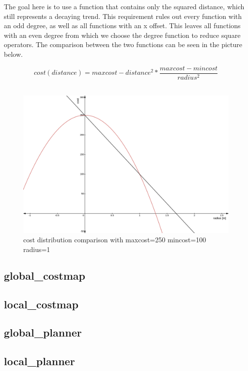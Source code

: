 The goal here is to use a function that contains only the squared distance, which still represents a decaying trend. This requirement rules out every function with an odd degree, as well as all functions with an x offset. This leaves all functions with an even degree from which we choose the  degree function to reduce square operators. The comparison between the two functions can be seen in the picture below.

\[cost(distance)=maxcost-distance^2*\frac{maxcost-mincost}{radius^2}\]\\
\begin{figure}[h!]
	\begin{center}
	\includegraphics[width=140mm]{Pictures/linear cost comparison}
	\caption{cost distribution comparison with maxcost=250 mincost=100 radius=1}
\end{center}
\end{figure}



\subsection{global\_costmap}

\subsection{local\_costmap}
\subsection{global\_planner}
\subsection{local\_planner}

